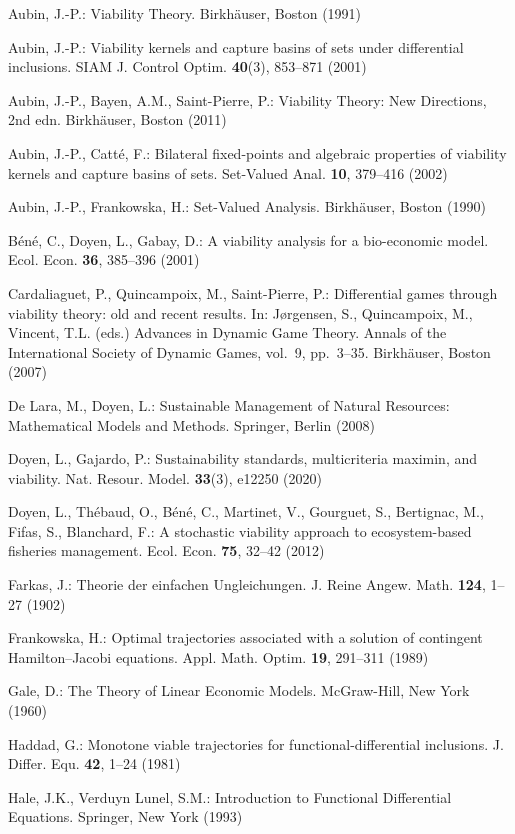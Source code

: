 \documentclass[11pt]{article}
\theoremstyle{definition}
\begin{document}
Aubin, J.-P.: Viability Theory. Birkh\"auser, Boston (1991)

Aubin, J.-P.: Viability kernels and capture basins of sets under differential inclusions. SIAM J. Control Optim. \textbf{40}(3), 853--871 (2001)

Aubin, J.-P., Bayen, A.M., Saint-Pierre, P.: Viability Theory: New Directions, 2nd edn. Birkh\"auser, Boston (2011)

Aubin, J.-P., Catt\'e, F.: Bilateral fixed-points and algebraic properties of viability kernels and capture basins of sets. Set-Valued Anal. \textbf{10}, 379--416 (2002)

Aubin, J.-P., Frankowska, H.: Set-Valued Analysis. Birkh\"auser, Boston (1990)

B\'en\'e, C., Doyen, L., Gabay, D.: A viability analysis for a bio-economic
model. Ecol. Econ. \textbf{36}, 385--396 (2001)

Cardaliaguet, P., Quincampoix, M., Saint-Pierre, P.: Differential games
through viability theory: old and recent results. In: J\o{}rgensen, S.,
Quincampoix, M., Vincent, T.L. (eds.) Advances in Dynamic Game Theory.
Annals of the International Society of Dynamic Games, vol.~9, pp.~3--35.
Birkh\"auser, Boston (2007)

De Lara, M., Doyen, L.: Sustainable Management of Natural Resources:
Mathematical Models and Methods. Springer, Berlin (2008)

Doyen, L., Gajardo, P.: Sustainability standards, multicriteria maximin,
and viability. Nat. Resour. Model. \textbf{33}(3), e12250 (2020)

Doyen, L., Th\'ebaud, O., B\'en\'e, C., Martinet, V., Gourguet, S., Bertignac,
M., Fifas, S., Blanchard, F.: A stochastic viability approach to
ecosystem-based fisheries management. Ecol. Econ. \textbf{75}, 32--42
(2012)

Farkas, J.: Theorie der einfachen Ungleichungen. J. Reine Angew. Math.
\textbf{124}, 1--27 (1902)

Frankowska, H.: Optimal trajectories associated with a solution of
contingent Hamilton--Jacobi equations. Appl. Math. Optim. \textbf{19},
291--311 (1989)

Gale, D.: The Theory of Linear Economic Models. McGraw-Hill, New York
(1960)

Haddad, G.: Monotone viable trajectories for functional-differential
inclusions. J. Differ. Equ. \textbf{42}, 1--24 (1981)

Hale, J.K., Verduyn Lunel, S.M.: Introduction to Functional Differential
Equations. Springer, New York (1993)
\end{document}
